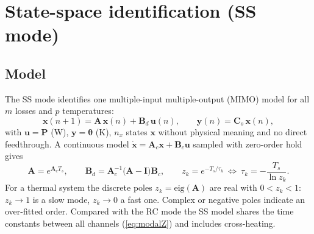 \documentclass[11pt,a4paper]{article}
\newcommand{\mat}[1]{\bm{#1}}
\begin{document}
\section{State-space identification (SS mode)}\label{sec:ss}
\subsection{Model}
The SS mode identifies one multiple-input multiple-output (MIMO) model for all $m$ losses and $p$ temperatures:
\begin{equation}
  \bm x(n+1) = \mat A\,\bm x(n) + \mat B_d\,\bm u(n),\qquad \bm y(n) = \mat C_o\,\bm x(n),
  \label{eq:ss}
\end{equation}
with $\bm u=\bm P$ (\si{\watt}), $\bm y=\bm\theta$ (\si{\kelvin}), $n_x$ states $\bm x$ without physical meaning and
no direct feedthrough. A continuous model $\dot{\bm x}=\mat A_c\bm x+\mat B_c\bm u$ sampled with zero-order hold
gives
\begin{equation}
  \mat A = e^{\mat A_cT_s},\qquad \mat B_d = \mat A_c^{-1}\bigl(\mat A-\mat I\bigr)\mat B_c,\qquad
  z_k = e^{-T_s/\tau_k}\ \Leftrightarrow\ \tau_k = -\frac{T_s}{\ln z_k}.
  \label{eq:zoh}
\end{equation}
For a thermal system the discrete poles $z_k=\mathrm{eig}(\mat A)$ are real with $0<z_k<1$: $z_k\to1$ is a slow
mode, $z_k\to0$ a fast one. Complex or negative poles indicate an over-fitted order. Compared with the RC mode the
SS model shares the time constants between all channels (\eqref{eq:modalZ}) and includes cross-heating.
\end{document}
